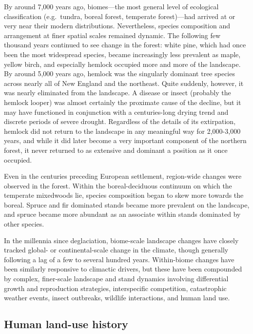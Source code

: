 \documentclass[]{tufte-handout}
\begin{document}
By around 7,000 years ago, biomes---the most general level of ecological
classification (e.g.~tundra, boreal forest, temperate forest)---had
arrived at or very near their modern distributions. Nevertheless,
species composition and arrangement at finer spatial scales remained
dynamic. The following few thousand years continued to see change in the
forest: white pine, which had once been the most widespread species,
became increasingly less prevalent as maple, yellow birch, and
especially hemlock occupied more and more of the landscape. By around
5,000 years ago, hemlock was the singularly dominant tree species across
nearly all of New England and the northeast. Quite suddenly, however, it
was nearly eliminated from the landscape. A disease or insect (probably
the hemlock looper) was almost certainly the proximate cause of the
decline, but it may have functioned in conjunction with a centuries-long
drying trend and discrete periods of severe drought. Regardless of the
details of its extirpation, hemlock did not return to the landscape in
any meaningful way for 2,000-3,000 years, and while it did later become
a very important component of the northern forest, it never returned to
as extensive and dominant a position as it once occupied.

Even in the centuries preceding European settlement, region-wide changes
were observed in the forest. Within the boreal-deciduous continuum on
which the temperate mixedwoods lie, species composition began to skew
more towards the boreal. Spruce and fir dominated stands became more
prevalent on the landscape, and spruce became more abundant as an
associate within stands dominated by other species.

In the millennia since deglaciation, biome-scale landscape changes have
closely tracked global- or continental-scale change in the climate,
though generally following a lag of a few to several hundred years.
Within-biome changes have been similarly responsive to climactic
drivers, but these have been compounded by complex, finer-scale
landscape and stand dynamics involving differential growth and
reproduction strategies, interspecific competition, catastrophic weather
events, insect outbreaks, wildlife interactions, and human land use.

\subsection{Human land-use history}\label{human-land-use-history}
\end{document}
